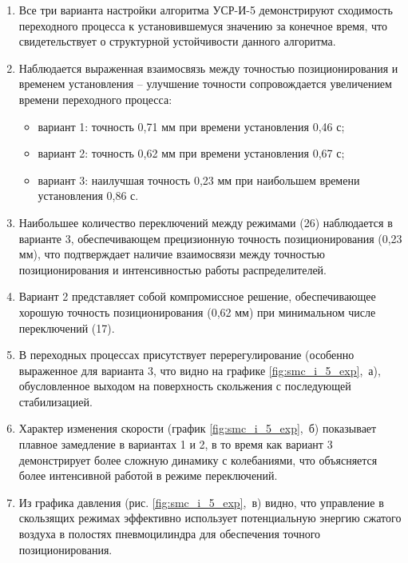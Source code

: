 \begin{enumerate}
	\item Все три варианта настройки алгоритма УСР-И-5 демонстрируют сходимость переходного процесса к установившемуся
	      значению за конечное время, что свидетельствует о структурной устойчивости данного алгоритма.

	\item Наблюдается выраженная взаимосвязь между точностью позиционирования
	      и временем установления -- улучшение точности сопровождается увеличением времени переходного процесса:
	      \begin{itemize}
		      \item вариант 1: точность 0,71 мм при времени установления 0,46 с;
		      \item вариант 2: точность 0,62 мм при времени установления 0,67 с;
		      \item вариант 3: наилучшая точность 0,23 мм при наибольшем времени установления 0,86 с.
	      \end{itemize}

	\item Наибольшее количество переключений между режимами (26) наблюдается в варианте 3,
	      обеспечивающем прецизионную точность позиционирования (0,23 мм), что подтверждает
	      наличие взаимосвязи между точностью позиционирования и интенсивностью работы распределителей.

	\item Вариант 2 представляет собой компромиссное решение, обеспечивающее хорошую
	      точность позиционирования (0,62 мм) при минимальном числе переключений (17).

	\item В переходных процессах присутствует перерегулирование (особенно выраженное для варианта 3,
	      что видно на графике \ref{fig:smc_i_5_exp},~а), обусловленное выходом на поверхность скольжения с последующей стабилизацией.

	\item Характер изменения скорости (график \ref{fig:smc_i_5_exp},~б) показывает плавное замедление в вариантах
	      1 и 2, в то время как вариант 3 демонстрирует более сложную динамику с
	      колебаниями, что объясняется более интенсивной работой в режиме переключений.

	\item Из графика давления (рис. \ref{fig:smc_i_5_exp},~в) видно, что управление в скользящих режимах эффективно
	      использует потенциальную энергию сжатого воздуха в полостях пневмоцилиндра для обеспечения точного позиционирования.
\end{enumerate}

